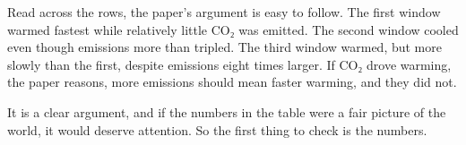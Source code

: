 Read across the rows, the paper's argument is easy to follow. The first window warmed fastest while relatively little CO₂ was emitted. The second window cooled even though emissions more than tripled. The third window warmed, but more slowly than the first, despite emissions eight times larger. If CO₂ drove warming, the paper reasons, more emissions should mean faster warming, and they did not.

It is a clear argument, and if the numbers in the table were a fair picture of the world, it would deserve attention. So the first thing to check is the numbers.
